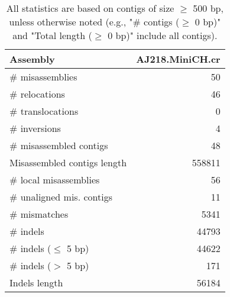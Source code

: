 \documentclass[12pt,a4paper]{article}
\begin{document}
\begin{table}[ht]
\begin{center}
\caption{All statistics are based on contigs of size $\geq$ 500 bp, unless otherwise noted (e.g., "\# contigs ($\geq$ 0 bp)" and "Total length ($\geq$ 0 bp)" include all contigs).}
\begin{tabular}{|l*{1}{|r}|}
\hline
Assembly & AJ218.MiniCH.cr \\ \hline
\# misassemblies & 50 \\ \hline
\hspace{5mm}\# relocations & 46 \\ \hline
\hspace{5mm}\# translocations & 0 \\ \hline
\hspace{5mm}\# inversions & 4 \\ \hline
\# misassembled contigs & 48 \\ \hline
Misassembled contigs length & 558811 \\ \hline
\# local misassemblies & 56 \\ \hline
\# unaligned mis. contigs & 11 \\ \hline
\# mismatches & 5341 \\ \hline
\# indels & 44793 \\ \hline
\hspace{5mm}\# indels ($\leq$ 5 bp) & 44622 \\ \hline
\hspace{5mm}\# indels ($>$ 5 bp) & 171 \\ \hline
Indels length & 56184 \\ \hline
\end{tabular}
\end{center}
\end{table}
\end{document}
